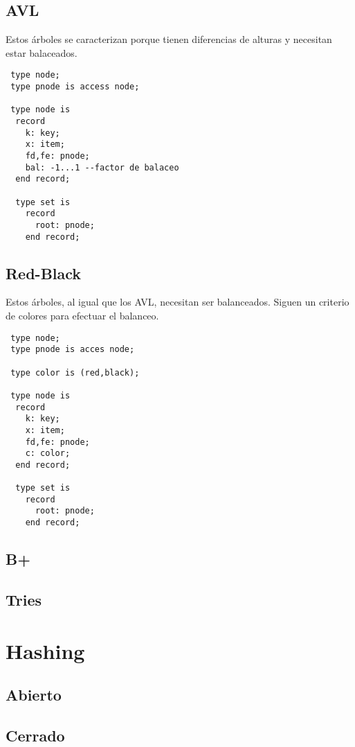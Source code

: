 \documentclass[a4paper,10pt]{book}
\begin{document}
\subsection{AVL}
Estos árboles se caracterizan porque tienen diferencias de alturas y necesitan estar balaceados.

\begin{lstlisting}
 type node;
 type pnode is access node;
 
 type node is
  record
    k: key;
    x: item;
    fd,fe: pnode;
    bal: -1...1 --factor de balaceo
  end record;
  
  type set is
    record
      root: pnode;
    end record;
\end{lstlisting}

\subsection{Red-Black}
Estos árboles, al igual que los AVL, necesitan ser balanceados. Siguen un criterio de colores para efectuar el balanceo.
\begin{lstlisting}
 type node;
 type pnode is acces node;
 
 type color is (red,black);
 
 type node is
  record
    k: key;
    x: item;
    fd,fe: pnode;
    c: color;
  end record;
  
  type set is
    record
      root: pnode;
    end record;
\end{lstlisting}

\subsection{B+}

\subsection{Tries}

\section{Hashing}

\subsection{Abierto}

\subsection{Cerrado}
\end{document}
